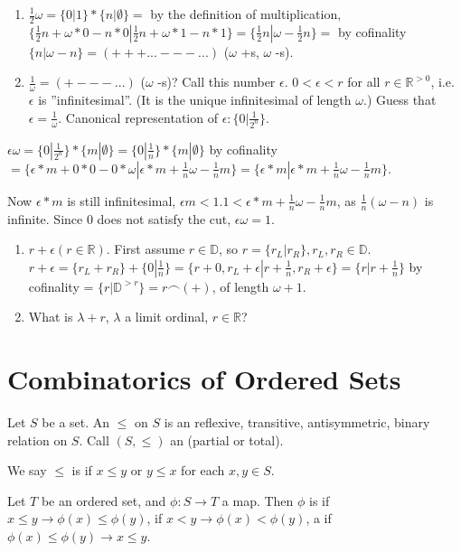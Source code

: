 \begin{enumerate}
  \item  $\frac{1}{2} \omega = \{0|1\}*\{n|\emptyset \}=$ by the definition of multiplication, $\{\frac{1}{2} n + \omega * 0 - n*0 | \frac{1}{2} n + \omega * 1 - n*1\}=\{\frac{1}{2} n|\omega -\frac{1}{2} n\}=$ by cofinality $\{n|\omega -n\}= (+++...---...)$ ($\omega$ +s, $\omega$ -s).
  \item  $\frac{1}{\omega}= (+---...)$ ($\omega$ -s)? Call this number $\epsilon$. $0<\epsilon <r$ for all $r \in \mathbb{R}^{>0}$, i.e. $\epsilon$ is ''infinitesimal''. (It is the unique infinitesimal of length $\omega$.) Guess that $\epsilon = \frac{1}{\omega}$. Canonical representation of $\epsilon: \{0|\frac{1}{2^n}\}$.
\end{enumerate}

$\epsilon \omega = \{0|\frac{1}{2^n}\}*\{m|\emptyset \}=\{0|\frac{1}{n}\}*\{m|\emptyset \}$ by cofinality $=\{\epsilon *m +0*0-0*\omega|\epsilon *m+\frac{1}{n}\omega - \frac{1}{n}m\}= \{\epsilon *m|\epsilon *m+\frac{1}{n}\omega - \frac{1}{n}m\}.$

Now $\epsilon *m$ is still infinitesimal, $\epsilon m <1.   1< \epsilon *m+\frac{1}{n}\omega - \frac{1}{n}m$, as $\frac{1}{n}(\omega -n)$ is infinite. Since $0$ does not satisfy the cut, $\epsilon \omega =1$.
\begin{enumerate}
  \item $r + \epsilon (r \in \mathbb{R})$. First assume $r \in \mathbb{D}$, so $r=\{r_L|r_R\}, r_L, r_R \in \mathbb{D}$. $r + \epsilon = \{r_L + r_R\} + \{0|\frac{1}{n}\}=\{r+0, r_L + \epsilon|r+\frac{1}{n}, r_R + \epsilon\}= \{r|r+\frac{1}{n}\}$ by cofinality = $\{r|\mathbb{D}^{>r}\}=r\frown(+)$, of length $\omega +1$.
  \item What is $\lambda +r$, $\lambda$ a limit ordinal, $r \in \mathbb{R}$?
\end{enumerate}

\section{Combinatorics of Ordered Sets}
Let $S$ be a set. An  $\leq$ on $S$ is an reflexive, transitive, antisymmetric, binary relation on $S$. Call $(S,\leq)$ an  (partial or total).

We say $\leq$ is  if $x \leq y$ or $y \leq x$ for each $x, y \in S$.

Let $T$ be an ordered set, and $\phi: S \rightarrow T$ a map. Then $\phi$ is  if $x \leq y \rightarrow \phi(x) \leq \phi(y)$,  if $x < y \rightarrow \phi(x) < \phi(y)$, a  if $\phi(x) \leq \phi(y) \rightarrow x \leq y$.

